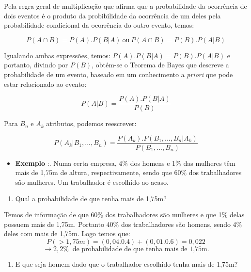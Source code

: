 \documentclass[
  openany]{book}
\providecommand{\tightlist}{%
  \setlength{\itemsep}{0pt}\setlength{\parskip}{0pt}}
\begin{document}
Pela regra geral de multiplicação que afirma que a probabilidade da ocorrência de dois eventos é o produto da probibilidade da ocorrência de um deles pela probabilidade condicional da ocorrência do outro evento, temos:

\begin{equation} 
 P(A \cap B)= P(A). P(B|A) \  \mbox{ou} \ P(A \cap B)= P(B). P(A|B)
  \label{eq:multprob}
\end{equation}

Igualando ambas expressões, temos: \(P(A). P(B|A) = P(B). P(A|B)\) e portanto, divindo por \(P(B)\), obtém-se o Teorema de Bayes que descreve a probabilidade de um evento, baseado em um conhecimento a \emph{priori} que pode estar relacionado ao evento:

\begin{equation} 
 P(A|B) = \frac{P(A).P(B|A)}{P(B)}
  \label{eq:bayes}
\end{equation}

Para \(B_n\) e \(A_k\) atributos, podemos reescrever:

\begin{equation} 
 P(A_k|B_1,...,B_n) = \frac{P(A_k).P(B_1,...,B_n|A_k)}{P(B_1,...,B_n)}
  \label{eq:bayesn}
\end{equation}

\begin{itemize}
\tightlist
\item
  \textbf{Exemplo} \citep{freund2009estatistica}:. Numa certa empresa, 4\% dos homens e 1\% das mulheres têm mais de 1,75m
  de altura, respectivamente, sendo que 60\% dos trabalhadores são mulheres. Um trabalhador é escolhido ao acaso.
\end{itemize}

\begin{enumerate}
\def\labelenumi{\alph{enumi}.}
\tightlist
\item
  Qual a probabilidade de que tenha mais de 1,75m?
\end{enumerate}

Temos de informação de que 60\% dos trabalhadores são mulheres e que 1\% delas possuem mais de 1,75m. Portanto 40\% dos trabalhadores são homens, sendo 4\% deles com mais de 1,75m. Logo temos que:
\[P(> 1, 75m) = (0, 04 . 0.4) + (0, 01 . 0.6) = 0, 022\]
\[\rightarrow 2, 2\% \ \mbox{ de probabilidade de que tenha mais de 1,75m.}\]

\begin{enumerate}
\def\labelenumi{\alph{enumi}.}
\setcounter{enumi}{1}
\tightlist
\item
  E que seja homem dado que o trabalhador escolhido tenha mais de 1,75m?
\end{enumerate}
\end{document}
